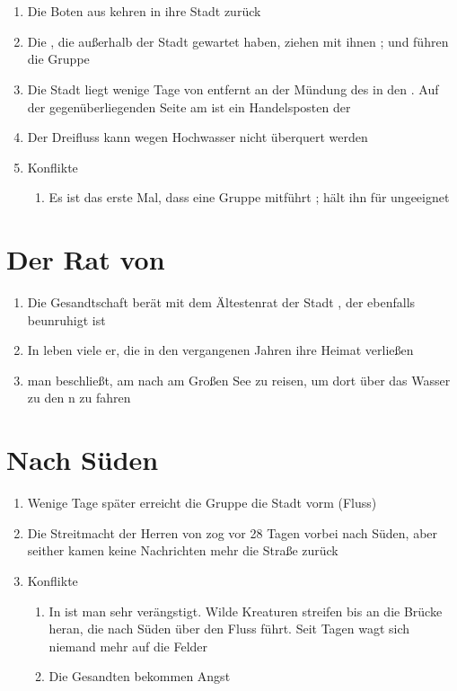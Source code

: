 \documentclass[12pt,a4paper,onecolumn,oneside,ngerman]{book}
\begin{document}
\chapter{\Toris}
\begin{enumerate}
  \item Die Boten aus {\Lobarn} kehren in ihre Stadt zurück
  \item Die {\Schattenlaufer}, die außerhalb der Stadt gewartet haben, ziehen mit ihnen ; {\Dolo} und {\Tremor} führen die Gruppe
  \item Die Stadt {\Toris} liegt wenige Tage von {\Rhin} entfernt an der Mündung des {\Rhingell} in den {\Dreifluss}. Auf der gegenüberliegenden Seite am {\Dreifluss} ist ein Handelsposten der {\Eisenmeister}
  \item Der Dreifluss kann wegen Hochwasser nicht überquert werden
  \item Konflikte
  \begin{enumerate}
    \item Es ist das erste Mal, dass {\Tremor} eine Gruppe mitführt ; {\Dolo} hält ihn für ungeeignet
  \end{enumerate}
\end{enumerate}

\chapter{Der Rat von \Toris}
\begin{enumerate}
  \item Die Gesandtschaft berät mit dem Ältestenrat der Stadt {\Toris}, der ebenfalls beunruhigt ist
  \item In {\Toris} leben viele {\Enland}er, die in den vergangenen Jahren ihre Heimat verließen
  \item man beschließt, am {\Dreifluss} nach {\Braucheln} am Großen See zu reisen, um dort über das Wasser zu den {\Eisenmeister}n zu fahren
\end{enumerate}

\chapter{Nach Süden}
\begin{enumerate}
  \item Wenige Tage später erreicht die Gruppe die Stadt {\Planis} vorm {\Grunarm}(Fluss)
  \item Die Streitmacht der Herren von {\Rhingell} zog vor 28 Tagen vorbei nach Süden, aber seither kamen keine Nachrichten mehr die Straße zurück
  \item Konflikte
  \begin{enumerate}
    \item In {\Planis} ist man sehr verängstigt. Wilde Kreaturen streifen bis an die Brücke heran, die nach Süden über den Fluss {\Grunarm} führt. Seit Tagen wagt sich niemand mehr auf die Felder
    \item Die Gesandten bekommen Angst
  \end{enumerate}
\end{enumerate}
 
\end{document}

